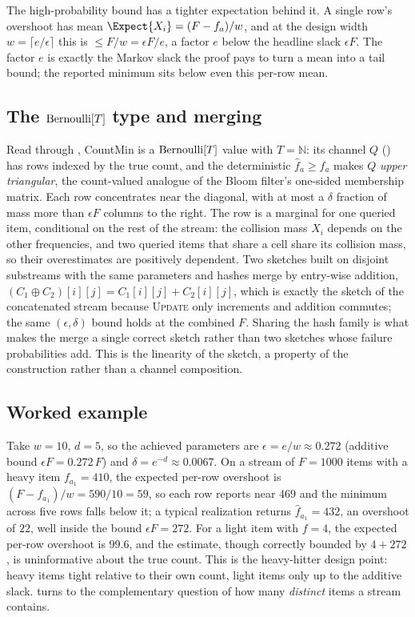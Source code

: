 \begin{remark}
\label{rem:expected-overshoot}
The high-probability bound has a tighter expectation behind it. A single row's
overshoot has mean $\Expect{X_i} = (F - f_a)/w$, and at the design width
$w = \lceil e/\epsilon \rceil$ this is $\le F/w = \epsilon F / e$, a factor $e$
below the headline slack $\epsilon F$. The factor $e$ is exactly the Markov
slack the proof pays to turn a mean into a tail bound; the reported minimum sits
below even this per-row mean.
\end{remark}

\subsection*{The $\mathrm{Bernoulli}[T]$ type and merging}

Read through , CountMin is a $\mathrm{Bernoulli}[T]$
value with $T = \mathbb{N}$: its channel $Q$ () has rows
indexed by the true count, and the deterministic $\hat f_a \ge f_a$ makes $Q$
\emph{upper triangular}, the count-valued analogue of the
Bloom filter's one-sided membership matrix. Each row concentrates near the
diagonal, with at most a $\delta$ fraction of mass more than $\epsilon F$ columns
to the right. The row is a marginal for one queried item, conditional on the
rest of the stream: the collision mass $X_i$ depends on the other frequencies,
and two queried items that share a cell share its collision mass, so their
overestimates are positively dependent. Two sketches built on disjoint
substreams with the same parameters and hashes merge by entry-wise addition,
$(C_1 \oplus C_2)[i][j] = C_1[i][j] + C_2[i][j]$, which is exactly the sketch of
the concatenated stream because \textsc{Update} only increments and addition
commutes; the same $(\epsilon, \delta)$ bound holds at the combined $F$. Sharing
the hash family is what makes the merge a single correct sketch rather than two
sketches whose failure probabilities add. This is the linearity of the sketch,
a property of the construction rather than a channel composition.

\subsection*{Worked example}

Take $w = 10$, $d = 5$, so the achieved parameters are $\epsilon = e/w \approx
0.272$ (additive bound $\epsilon F = 0.272\,F$) and $\delta = e^{-d} \approx
0.0067$. On a stream of $F = 1000$ items with a heavy item $f_{a_1} = 410$, the
expected per-row overshoot is $(F - f_{a_1})/w = 590/10 = 59$, so each row
reports near $469$ and the minimum across five rows falls below it; a typical
realization returns $\hat f_{a_1} = 432$, an overshoot of $22$, well inside the
bound $\epsilon F = 272$. For a light item with $f = 4$, the expected per-row
overshoot is $99.6$, and the estimate, though correctly bounded by $4 + 272$, is
uninformative about the true count. This is the heavy-hitter design point:
heavy items tight relative to their own count, light items only up to the
additive slack.  turns to the complementary question of
how many \emph{distinct} items a stream contains.
